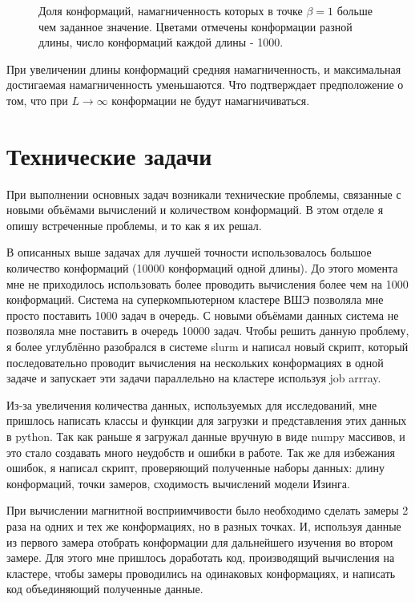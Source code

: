 \documentclass[a4paper,12pt]{article}
\begin{document}
\begin{figure}[htb]
	\centering
	
	\caption{Доля конформаций, намагниченность которых в точке $\beta = 1$ больше чем заданное значение. Цветами отмечены конформации разной длины, число конформаций каждой длины - 1000.}
	\label{fig:fraction_magnetization}
\end{figure}

При увеличении длины конформаций средняя намагниченность, и максимальная достигаемая намагниченность уменьшаются. Что подтверждает предположение о том, что при $L\to \infty$ конформации не будут намагничиваться.

\section{Технические задачи}
При выполнении основных задач возникали технические проблемы, связанные с новыми объёмами вычислений и количеством конформаций. В этом отделе я опишу встреченные проблемы, и то как я их решал.

В описанных выше задачах для лучшей точности использовалось большое количество конформаций (10000 конформаций одной длины). До этого момента мне не приходилось использовать более проводить вычисления более чем на 1000 конформаций. Система на суперкомпьютерном кластере ВШЭ позволяла мне просто поставить 1000 задач в очередь. С новыми объёмами данных система не позволяла мне поставить в очередь 10000 задач. Чтобы решить данную проблему, я более углублённо разобрался в системе slurm и написал новый скрипт, который последовательно проводит вычисления на нескольких конформациях в одной задаче и запускает эти задачи параллельно на кластере используя job arrray.

Из-за увеличения количества данных, используемых для исследований, мне пришлось написать классы и функции для загрузки и представления этих данных в python. Так как раньше я загружал данные вручную в виде numpy массивов, и это стало создавать много неудобств и ошибки в работе. Так же для избежания ошибок, я написал скрипт, проверяющий полученные наборы данных: длину конформаций, точки замеров, сходимость вычислений модели Изинга.

При вычислении магнитной восприимчивости было необходимо сделать замеры 2 раза на одних и тех же конформациях, но в разных точках. И, используя данные из первого замера отобрать
конформации для дальнейшего изучения во втором замере. Для этого мне пришлось доработать код, производящий вычисления на кластере, чтобы замеры проводились на одинаковых конформациях, и написать код объединяющий полученные данные. 
\end{document}
